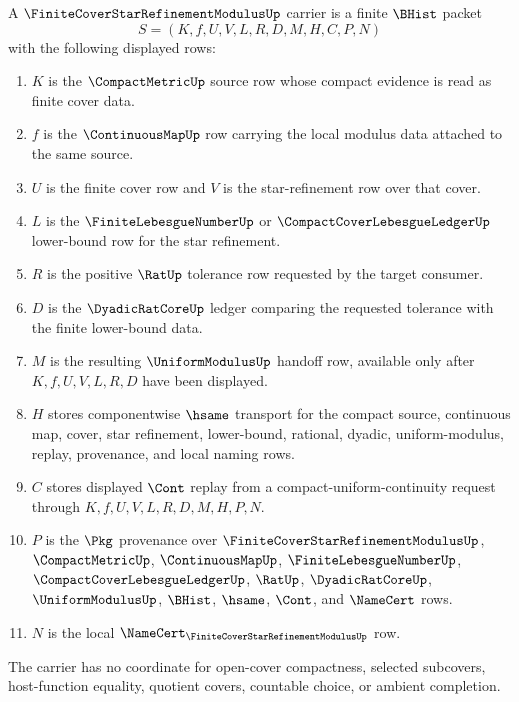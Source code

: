 \begin{definition}
\label{def:finite-cover-star-refinement-modulus-carrier}
A $\FiniteCoverStarRefinementModulusUp$ carrier is a finite $\BHist$ packet
$$
S=(K,f,U,V,L,R,D,M,H,C,P,N)
$$
with the following displayed rows:
\begin{enumerate}
\item $K$ is the $\CompactMetricUp$ source row whose compact evidence is read as finite cover data.
\item $f$ is the $\ContinuousMapUp$ row carrying the local modulus data attached to the same source.
\item $U$ is the finite cover row and $V$ is the star-refinement row over that cover.
\item $L$ is the $\FiniteLebesgueNumberUp$ or $\CompactCoverLebesgueLedgerUp$ lower-bound row for the star refinement.
\item $R$ is the positive $\RatUp$ tolerance row requested by the target consumer.
\item $D$ is the $\DyadicRatCoreUp$ ledger comparing the requested tolerance with the finite lower-bound data.
\item $M$ is the resulting $\UniformModulusUp$ handoff row, available only after $K,f,U,V,L,R,D$ have been displayed.
\item $H$ stores componentwise $\hsame$ transport for the compact source, continuous map, cover, star refinement, lower-bound, rational, dyadic, uniform-modulus, replay, provenance, and local naming rows.
\item $C$ stores displayed $\Cont$ replay from a compact-uniform-continuity request through $K,f,U,V,L,R,D,M,H,P,N$.
\item $P$ is the $\Pkg$ provenance over $\FiniteCoverStarRefinementModulusUp$, $\CompactMetricUp$, $\ContinuousMapUp$, $\FiniteLebesgueNumberUp$, $\CompactCoverLebesgueLedgerUp$, $\RatUp$, $\DyadicRatCoreUp$, $\UniformModulusUp$, $\BHist$, $\hsame$, $\Cont$, and $\NameCert$ rows.
\item $N$ is the local $\NameCert_{\FiniteCoverStarRefinementModulusUp}$ row.
\end{enumerate}
The carrier has no coordinate for open-cover compactness, selected subcovers, host-function equality, quotient covers, countable choice, or ambient completion.
\end{definition}

